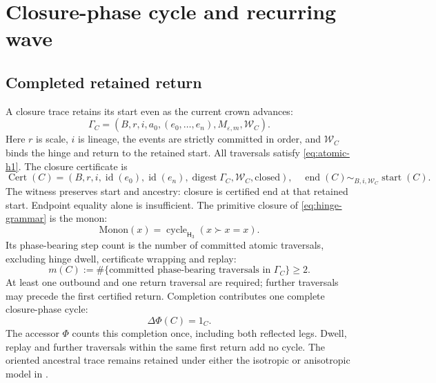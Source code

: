 \section{Closure-phase cycle and recurring wave}
\label{sec:closure-phase-wave}

\subsection{Completed retained return}
\label{subsec:monon-beat}
\label{subsec:monon-cycle}
A closure trace retains its start even as the current crown advances:
\begin{equation}
\Gamma_C=(B,r,i,a_0,(e_0,\ldots,e_n),M_{\varepsilon,m},\mathcal W_C).
\label{eq:closure-trace}
\end{equation}
Here \(r\) is scale, \(i\) is lineage, the events are strictly committed in
order, and \(\mathcal W_C\) binds the hinge and return to the retained start.
All traversals satisfy \eqref{eq:atomic-h1}. The closure certificate is
\begin{equation}
\operatorname{Cert}(C)=
(B,r,i,\operatorname{id}(e_0),\operatorname{id}(e_n),
\operatorname{digest}\Gamma_C,\mathcal W_C,\mathrm{closed}),
\quad \operatorname{end}(C)\sim_{B,i,\mathcal W_C}\operatorname{start}(C).
\label{eq:closure-certificate}
\end{equation}
The witness preserves start and ancestry: closure is certified end at that
retained start. Endpoint equality alone is insufficient. The primitive closure
of \eqref{eq:hinge-grammar} is the monon:
\begin{equation}
\mathrm{Monon}(x)=\operatorname{cycle}_{\mathsf H_3}(x\succ x=x).
\label{eq:monon-cycle}
\end{equation}
Its phase-bearing step count is the number of committed atomic traversals,
excluding hinge dwell, certificate wrapping and replay:
\begin{equation}
m(C):=\#\{\text{committed phase-bearing traversals in }\Gamma_C\}\ge2.
\label{eq:closure-phase-step-count}
\end{equation}
At least one outbound and one return traversal are required; further traversals
may precede the first certified return. Completion contributes one complete
closure-phase cycle:
\begin{equation}
\Delta\Phi(C)=1_C.
\label{eq:closure-phase}
\end{equation}
The accessor \(\Phi\) counts this completion once, including both reflected
legs. Dwell, replay and further traversals within the same first return add no
cycle. The oriented ancestral trace remains retained under either the isotropic
or anisotropic model in .

